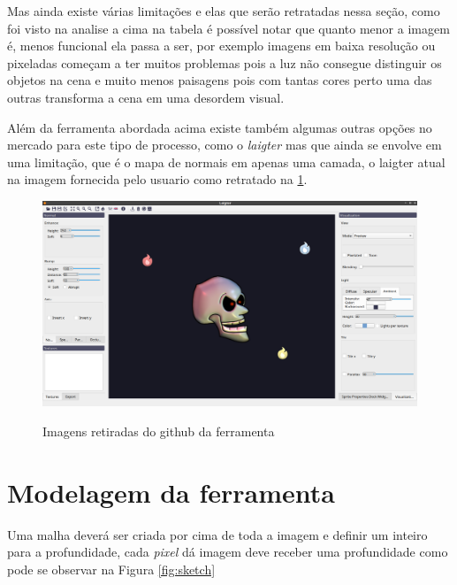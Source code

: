 Mas ainda existe várias limitações e elas que serão retratadas nessa seção, como foi visto na analise a cima na tabela é possível notar que quanto menor a imagem é, menos funcional ela passa a ser, por exemplo imagens em baixa resolução ou pixeladas começam a ter muitos problemas pois a luz não consegue distinguir os objetos na cena e muito menos paisagens pois com tantas cores perto uma das outras transforma a cena em uma desordem visual.

Além da ferramenta abordada acima existe também algumas outras opções no mercado para este tipo de processo, como o \textit{laigter} mas que ainda se envolve em uma limitação, que é o mapa de normais em apenas uma camada, o laigter atual na imagem fornecida pelo usuario como retratado na \ref{fig:laigter}.

\FloatBarrier
    \begin{figure}[ht]
        \caption{Imagens retiradas do github da ferramenta}
        \centering
        \includegraphics[scale=0.2]{imagens/laigter_example.png}
        \label{fig:laigter}
    \end{figure}
\FloatBarrier
    

\section{Modelagem da ferramenta}

Uma malha deverá ser criada por cima de toda a imagem e definir um inteiro para a profundidade, cada \textit{pixel} dá imagem deve receber uma profundidade como pode se observar na Figura \ref{fig:sketch}

